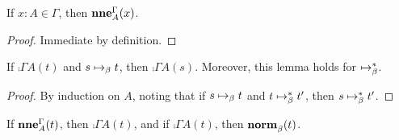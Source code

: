 \documentclass[a4paper]{article}
\begin{document}
\begin{theorem}[\cref{ax:0002}]\label{thm:0003}
  If $x : A \in \Gamma$, then $\operatorname{\mathbf{nne}}^{\Gamma}_{A}(x)$.
\end{theorem}
\begin{proof}
  Immediate by definition.
\end{proof}

\begin{lemma}\label{thm:1010}
  If $\comp{\Gamma}{A}(t)$ and $s \bRed t$, then $\comp{\Gamma}{A}(s)$.
  Moreover, this lemma holds for $\bRed*$.
\end{lemma}
\begin{proof}
  By induction on $A$, noting that if $s \bRed t$ and $t \bRed* t'$, then $s \bRed* t'$.
\end{proof}

\begin{theorem}[\cref{ax:0000}]\label{thm:0006}
  If $\operatorname{\mathbf{nne}}^{\Gamma}_{A}(t)$, then $\comp{\Gamma}{A}(t)$, and if $\comp{\Gamma}{A}(t)$, then $\operatorname{\mathbf{norm}}^{}_{\beta}(t)$.
\end{theorem}
\end{document}
